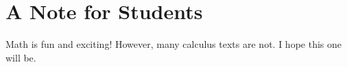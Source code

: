 \chapter*{A Note for Students}
\label{chap:Preface}

Math is fun and exciting! However, many calculus texts are not. I hope this one will be.


